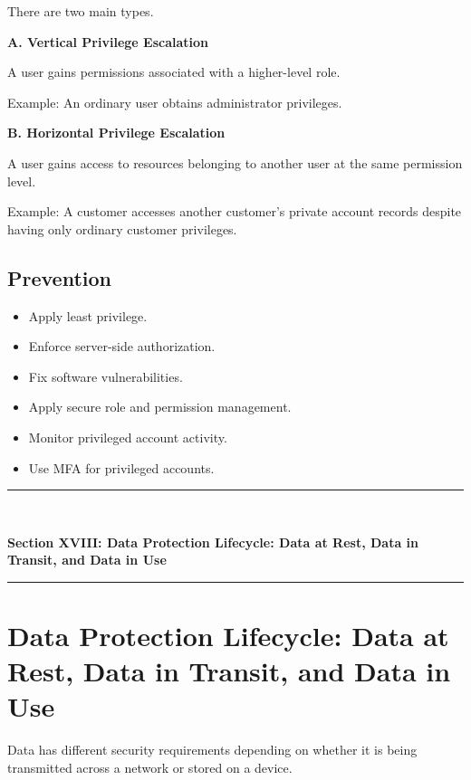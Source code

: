 There are two main types.

\textbf{A. Vertical Privilege Escalation}

A user gains permissions associated with a higher-level role.

Example: An ordinary user obtains administrator privileges.

\textbf{B. Horizontal Privilege Escalation}

A user gains access to resources belonging to another user at the same permission level.

Example: A customer accesses another customer's private account records despite having only ordinary customer privileges.

\subsection{Prevention}

\begin{itemize}
\item Apply least privilege.
\item Enforce server-side authorization.
\item Fix software vulnerabilities.
\item Apply secure role and permission management.
\item Monitor privileged account activity.
\item Use MFA for privileged accounts.
\end{itemize}


\newpage
\begin{center}
\vspace{0.5em}
{\color{primary}\rule{0.45\textwidth}{1.2pt}\\[4pt]}
{\Large\bfseries\color{primary} Section XVIII: Data Protection Lifecycle: Data at Rest, Data in Transit, and Data in Use\\[2pt]}
{\color{primary}\rule{0.45\textwidth}{1.2pt}}
\vspace{0.5em}
\end{center}

\section{Data Protection Lifecycle: Data at Rest, Data in Transit, and Data in Use}


Data has different security requirements depending on whether it is being transmitted across a network or stored on a device.

